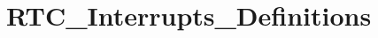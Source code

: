 \hypertarget{group___r_t_c___interrupts___definitions}{\section{R\-T\-C\-\_\-\-Interrupts\-\_\-\-Definitions}
\label{group___r_t_c___interrupts___definitions}
}
